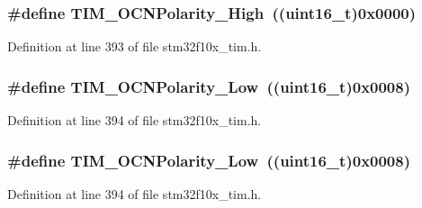 \subsubsection[{\texorpdfstring{T\+I\+M\+\_\+\+O\+C\+N\+Polarity\+\_\+\+High}{TIM_OCNPolarity_High}}]{\setlength{\rightskip}{0pt plus 5cm}\#define T\+I\+M\+\_\+\+O\+C\+N\+Polarity\+\_\+\+High~(({\bf uint16\+\_\+t})0x0000)}\hypertarget{group___t_i_m___output___compare___n___polarity_gaa62288888d4f6858bee6b3cd9086ae3f}{}\label{group___t_i_m___output___compare___n___polarity_gaa62288888d4f6858bee6b3cd9086ae3f}


Definition at line 393 of file stm32f10x\+\_\+tim.\+h.

\subsubsection[{\texorpdfstring{T\+I\+M\+\_\+\+O\+C\+N\+Polarity\+\_\+\+Low}{TIM_OCNPolarity_Low}}]{\setlength{\rightskip}{0pt plus 5cm}\#define T\+I\+M\+\_\+\+O\+C\+N\+Polarity\+\_\+\+Low~(({\bf uint16\+\_\+t})0x0008)}\hypertarget{group___t_i_m___output___compare___n___polarity_ga9582560b2e7dae2e8dc3b65909b0c9cf}{}\label{group___t_i_m___output___compare___n___polarity_ga9582560b2e7dae2e8dc3b65909b0c9cf}


Definition at line 394 of file stm32f10x\+\_\+tim.\+h.

\subsubsection[{\texorpdfstring{T\+I\+M\+\_\+\+O\+C\+N\+Polarity\+\_\+\+Low}{TIM_OCNPolarity_Low}}]{\setlength{\rightskip}{0pt plus 5cm}\#define T\+I\+M\+\_\+\+O\+C\+N\+Polarity\+\_\+\+Low~(({\bf uint16\+\_\+t})0x0008)}\hypertarget{group___t_i_m___output___compare___n___polarity_ga9582560b2e7dae2e8dc3b65909b0c9cf}{}\label{group___t_i_m___output___compare___n___polarity_ga9582560b2e7dae2e8dc3b65909b0c9cf}


Definition at line 394 of file stm32f10x\+\_\+tim.\+h.

